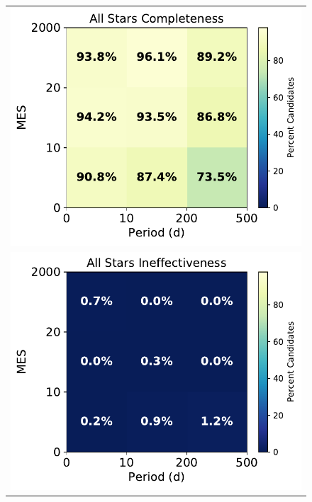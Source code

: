 \begin{figure}[hp]
\begin{center}
\begin{tabular}{c}
\includegraphics[width=.99\linewidth]{f8-top.pdf} \\[1pt]
\includegraphics[width=.99\linewidth]{f8-middle.pdf} \\[1pt]

\end{tabular}
\end{center}
\end{figure}
